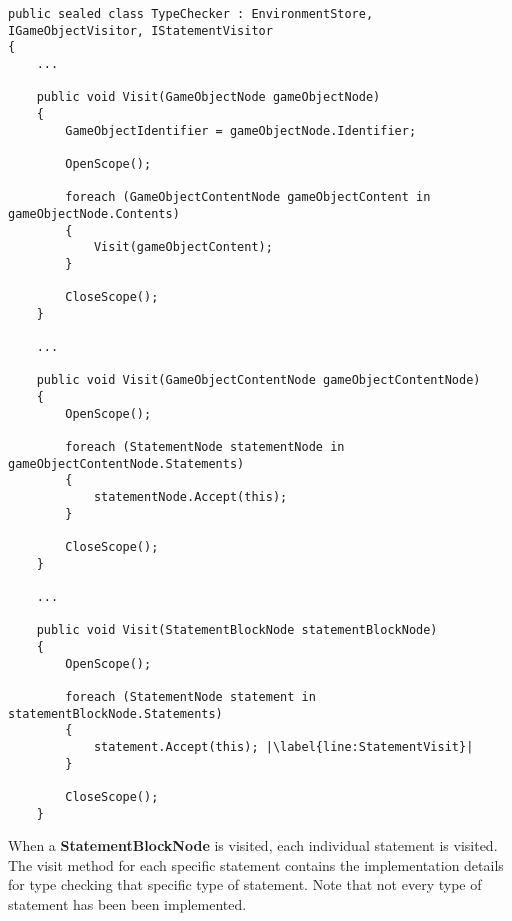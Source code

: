 \begin{lstlisting}[language=CSharp, caption={Applying Scope to GameObjects, GameObjectContents and StatementBlocks}, label={lst:ApplyScope},escapechar=|]
public sealed class TypeChecker : EnvironmentStore, IGameObjectVisitor, IStatementVisitor
{
    ...

    public void Visit(GameObjectNode gameObjectNode)
    {
        GameObjectIdentifier = gameObjectNode.Identifier;

        OpenScope();

        foreach (GameObjectContentNode gameObjectContent in gameObjectNode.Contents) 
        {
            Visit(gameObjectContent);
        }

        CloseScope();
    }

    ...

    public void Visit(GameObjectContentNode gameObjectContentNode)
    {
        OpenScope();

        foreach (StatementNode statementNode in gameObjectContentNode.Statements)
        {
            statementNode.Accept(this);
        }

        CloseScope();
    }

    ... 

    public void Visit(StatementBlockNode statementBlockNode)
    {
        OpenScope();

        foreach (StatementNode statement in statementBlockNode.Statements) 
        {
            statement.Accept(this); |\label{line:StatementVisit}|
        }
        
        CloseScope();
    }
\end{lstlisting}

When a \textbf{StatementBlockNode} is visited, each individual statement is visited. The visit method for each specific statement contains the implementation details for type checking that specific type of statement. Note that not every type of statement has been been implemented.
